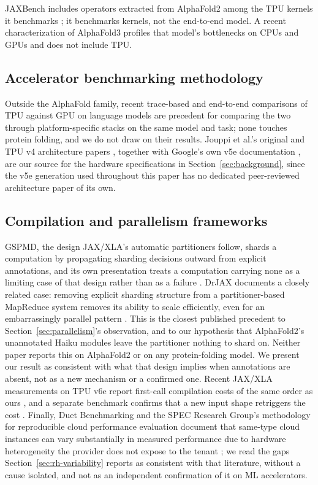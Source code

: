 JAXBench includes operators extracted from AlphaFold2 among the TPU
kernels it benchmarks \citep{jaxbench2026}; it benchmarks kernels, not
the end-to-end model. A recent characterization of AlphaFold3 profiles
that model's bottlenecks on CPUs and GPUs \citep{iiswc2025af3} and does
not include TPU.

\subsection{Accelerator benchmarking methodology}
\label{sec:rw-benchmarking}

Outside the AlphaFold family, recent trace-based and end-to-end
comparisons of TPU against GPU on language models
\citep{ding2026cclbench,gemma2026tpu} are precedent for comparing the
two through platform-specific stacks on the same model and task; none
touches protein folding, and we do not draw on their results.
Jouppi et al.'s original and TPU v4 architecture papers
\citep{jouppi2017tpu,jouppi2023tpuv4}, together with Google's own v5e
documentation \citep{googletpuv5e}, are our source for the hardware
specifications in Section~\ref{sec:background}, since the v5e
generation used throughout this paper has no dedicated peer-reviewed
architecture paper of its own.

\subsection{Compilation and parallelism frameworks}
\label{sec:rw-frameworks}

GSPMD, the design JAX/XLA's automatic partitioners follow, shards a
computation by propagating sharding decisions outward from explicit
annotations, and its own presentation treats a computation carrying
none as a limiting case of that design rather than as a failure
\citep{xu2021gspmd}. DrJAX documents a
closely related case: removing explicit sharding structure from a
partitioner-based MapReduce system removes its ability to scale efficiently,
even for an embarrassingly parallel pattern \citep{drjax2024}. This is
the closest published precedent to Section~\ref{sec:parallelism}'s
observation, and to our hypothesis that AlphaFold2's unannotated Haiku
modules leave the partitioner nothing to shard on. Neither paper
reports this on AlphaFold2 or on any protein-folding model. We present
our result as consistent with what that design implies when
annotations are absent, not as a new mechanism or a confirmed one. Recent JAX/XLA
measurements on TPU v6e report first-call compilation costs of the
same order as ours \citep{jitcompile2026}, and a separate benchmark
confirms that a new input shape retriggers the cost
\citep{warmup2025}. Finally, Duet Benchmarking and the SPEC
Research Group's methodology for reproducible cloud performance
evaluation document that same-type cloud instances can vary
substantially in measured performance due to hardware heterogeneity
the provider does not expose to the tenant
\citep{bulej2020duet,papadopoulos2021specrg}; we read the gaps
Section~\ref{sec:rh-variability} reports as consistent with that
literature, without a cause isolated, and not as an independent
confirmation of it on ML accelerators.
